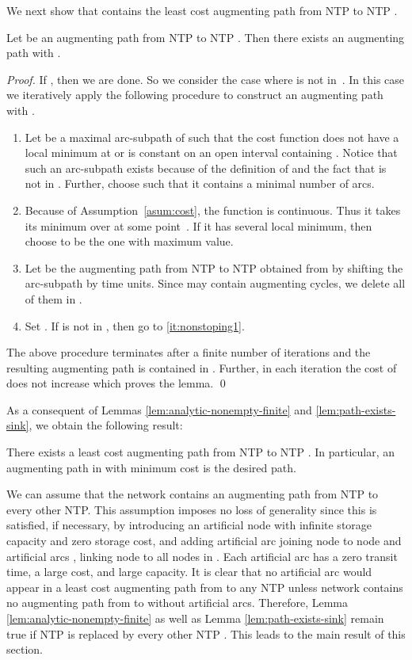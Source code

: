 \documentclass{svjour3}                     \smartqed
\begin{document}
We next show that  contains the least cost augmenting path from NTP  to NTP .

\begin{lemma}
\label{lem:path-exists-sink}
Let  be an augmenting path from NTP  to NTP . Then there exists an augmenting path  with .
\end{lemma}
\begin{proof}
If , then we are done. So we consider the case where  is not in~. In this case we iteratively apply the following procedure to construct an augmenting path~  with .
\begin{enumerate}[label = (\roman*)]
\item\label{it:nonstoping1}
  Let  be a maximal arc-subpath of  such that the cost function  does not have a local minimum at  or is constant on an open interval containing . Notice that such an arc-subpath exists because of the definition of  and the fact that  is not in . Further, choose  such that it contains a minimal number of arcs.
\item
  Because of Assumption~\ref{asum:cost}, the function  is continuous. Thus it takes its minimum over  at some point~. If it has several local minimum, then choose  to be the one with maximum value.
\item
  Let  be the augmenting path from NTP  to NTP  obtained from  by shifting the arc-subpath  by  time units. Since  may contain augmenting cycles, we delete all of them in .
\item\label{it:nonstoping2} Set . If  is not in , then go to \ref{it:nonstoping1}.
\end{enumerate}
The above procedure terminates after a finite number of iterations and the resulting augmenting path  is contained in . Further, in each iteration the cost of  does not increase which proves the lemma.
\qed\end{proof}

As a consequent of Lemmas \ref{lem:analytic-nonempty-finite} and \ref{lem:path-exists-sink}, we obtain the following result:
\begin{theorem}
\label{thm:CDSP-existence}
There exists a least cost augmenting path from NTP  to NTP . In particular, an augmenting path in  with minimum cost is the desired path.
\end{theorem}


We can assume that the network  contains an augmenting path from NTP  to every other NTP. This assumption imposes no loss of generality since this is satisfied, if necessary, by introducing an artificial  node  with infinite storage capacity and zero storage cost, and adding artificial arc  joining node  to node  and artificial arcs , linking node  to all nodes in . Each artificial arc has a zero transit time, a large cost, and large capacity. It is clear that no artificial arc would appear in a least cost augmenting path from  to any NTP  unless network  contains no augmenting path from  to  without artificial arcs. Therefore, Lemma \ref{lem:analytic-nonempty-finite} as well as Lemma \ref{lem:path-exists-sink} remain true if NTP  is replaced by every other NTP . This leads to the main result of this section.
\end{document}
